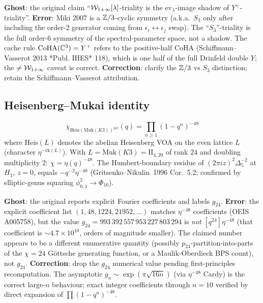 \textbf{Ghost}: the original claim ``$\mathcal{W}_{1+\infty}[\lambda]$-triality is the $\mathrm{ev}_\lambda$-image shadow of $Y^+$-triality''. \textbf{Error}: Miki 2007 is a $\mathbb{Z}/3$-cyclic symmetry (a.k.a.\ $S_3$ only after including the order-2 generator coming from $\epsilon_i \leftrightarrow \epsilon_j$ swap). The ``$S_3$''-triality is the full order-6 symmetry of the spectral-parameter space, not a shadow. The cache rule $\mathrm{CoHA}(\mathbb{C}^3) = Y^+$ refers to the positive-half CoHA (Schiffmann--Vasserot 2013 *Publ. IHES* 118), which is one half of the full Drinfeld double $Y$; the $\neq \mathcal{W}_{1+\infty}$ caveat is correct. \textbf{Correction}: clarify the $\mathbb{Z}/3$ vs $S_3$ distinction; retain the Schiffmann--Vasserot attribution.

\subsection{Heisenberg--Mukai identity}
\label{wn:subsec:healed-heis-mukai}

\begin{theorem}\ClaimStatusHealed
\label{wn:thm:healed-heis-mukai}
\[
\chi_{\mathrm{Heis}(\mathrm{Muk}(K3))^{\oplus 2}}(q) = \prod_{n \geq 1} (1 - q^n)^{-48}
\]
where $\mathrm{Heis}(L)$ denotes the abelian Heisenberg VOA on the even lattice $L$ (character $\eta^{-\mathrm{rk}(L)}$). With $L = \mathrm{Muk}(K3) = \mathrm{II}_{4, 20}$ of rank $24$ and doubling multiplicity $2$: $\chi = \eta(q)^{-48}$. The Humbert-boundary residue of $(2\pi i z)^2 \Delta_5^{-2}$ at $H_1$, $z = 0$, equals $-q^{-2} \eta^{-48}$ (Gritsenko--Nikulin~1996 Cor.~5.2; confirmed by elliptic-genus squaring $\phi_{0, 1}^2 \to \Phi_{10}$).
\end{theorem}

\textbf{Ghost}: the original reports explicit Fourier coefficients and labels $g_{24}$. \textbf{Error}: the explicit coefficient list $(1, 48, 1224, 21952, \ldots)$ matches $\eta^{-48}$ coefficients (OEIS A005758), but the value $g_{24} = 993\,392\,557\,953\,227\,803\,294$ is \emph{not} $[q^{24}] \eta^{-48}$ (that coefficient is $\sim 4.7 \times 10^{10}$, orders of magnitude smaller). The claimed number appears to be a different enumerative quantity (possibly $p_{24}$-partition-into-parts of the $\chi = 24$ Göttsche generating function, or a Maulik-Oberdieck BPS count), not $g_{24}$. \textbf{Correction}: drop the $g_{24}$ numerical value pending first-principles recomputation. The asymptotic $g_n \sim \exp(\pi \sqrt{16n})$ (via $\eta^{-48}$ Cardy) is the correct large-$n$ behaviour; exact integer coefficients through $n = 10$ verified by direct expansion of $\prod (1 - q^n)^{-48}$.

